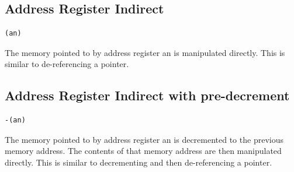 \documentclass[10pt,fullpage]{article}
\begin{document}
\subsection*{Address Register Indirect}
\begin{verbatim}(an)\end{verbatim}
The memory pointed to by address register an is manipulated
directly. This is similar to de-referencing a pointer.

\subsection*{Address Register Indirect with pre-decrement}
\begin{verbatim}-(an)\end{verbatim}
The memory pointed to by address register an is decremented to the
previous memory address. The contents of that memory address are
then manipulated directly. This is similar to decrementing and then
de-referencing a pointer.


\end{document}
